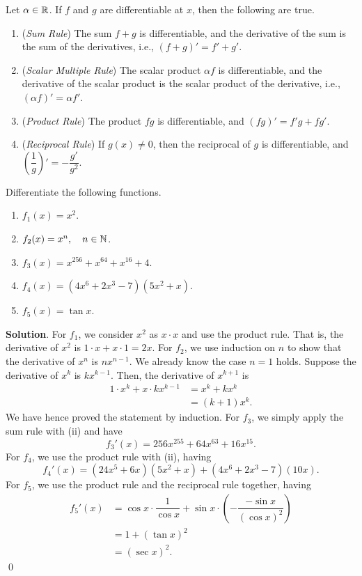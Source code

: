 \documentclass[11pt]{book}
\begin{document}
\setlength{\delimitershortfall}{0pt}
\begin{theorem}\label{diff_op}
    Let $\alpha\in\mathbb{R}$. If $f$ and $g$ are differentiable at $x$, then the following are true.
    \begin{enumerate}
        \item (\textit{Sum Rule}) The sum $f+g$ is differentiable, and the derivative of the sum is the sum of the derivatives, i.e., $(f+g)'=f'+g'$.
        \item (\textit{Scalar Multiple Rule}) The scalar product $\alpha f$ is differentiable, and the derivative of the scalar product is the scalar product of the derivative, i.e., $(\alpha f)'=\alpha f'$.
        \item (\textit{Product Rule}) The product $fg$ is differentiable, and $(fg)'=f'g+fg'$.
        \item (\textit{Reciprocal Rule}) If $g(x)\ne 0$, then the reciprocal of $g$ is differentiable, and $\left(\dfrac{1}{g}\right)'=-\dfrac{g'}{g^2}$.
    \end{enumerate}
\end{theorem}

\begin{example}
    Differentiate the following functions.
    \begin{enumerate}
        \item $f_1(x)=x^2$.
        \item $f_2(x)=x^n, \quad n\in\mathbb{N}$.
        \item $f_3(x)=x^{256}+x^{64}+x^{16}+4$.
        \item $f_4(x)=(4x^6+2x^3-7)(5x^2+x)$.
        \item $f_5(x)=\tan x$.
    \end{enumerate}
\end{example}
\textbf{Solution}. For $f_1$, we consider $x^2$ as $x\cdot x$ and use the product rule. That is, the derivative of $x^2$ is $1\cdot x+x\cdot 1=2x$. For $f_2$, we use induction on $n$ to show that the derivative of $x^n$ is $nx^{n-1}$. We already know the case $n=1$ holds. Suppose the derivative of $x^k$ is $kx^{k-1}$. Then, the derivative of $x^{k+1}$ is \begin{align*}
    1\cdot x^k+x\cdot kx^{k-1}&=x^k+kx^k\\
    &=(k+1)x^k.
\end{align*} We have hence proved the statement by induction. For $f_3$, we simply apply the sum rule with (ii) and have $${f_3}'(x)=256x^{255}+64x^{63}+16x^{15}.$$ For $f_4$, we use the product rule with (ii), having $${f_4}'(x)=(24x^5+6x)(5x^2+x)+(4x^6+2x^3-7)(10x).$$ For $f_5$, we use the product rule and the reciprocal rule together, having \begin{align*}
    {f_5}'(x)&=\cos x\cdot\dfrac{1}{\cos x}+\sin x\cdot\left(-\dfrac{-\sin x}{(\cos x)^2}\right)\\
    &=1+(\tan x)^2\\
    &=(\sec x)^2.
\end{align*} \qed
\setlength{\delimitershortfall}{13.5pt}
\end{document}

